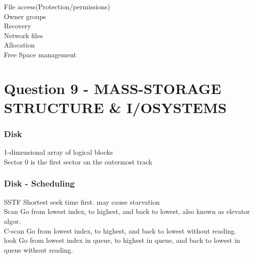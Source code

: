 \documentclass[a4paper,10pt,titlepage]{report}
\begin{document}
\vspace{5mm}
File access(Protection/permissions)\\
\hspace{10mm} Owner groups\\

\vspace{5mm}
Recovery \\


\vspace{5mm}
Network files \\



\vspace{5mm}
Allocation \\


\vspace{5mm}
Free Space management \\

\hspace{10mm}



	




\section{Question 9 - MASS-STORAGE STRUCTURE \& I/OSYSTEMS }


\subsubsection{Disk}
1-dimensional array of logical blocks\\

Sector 0 is the first sector on the outermost track \\

\subsubsection{Disk - Scheduling}
SSTF
Shortest seek time first.
may cause starvation\\

Scan
Go from lowest index, to highest, and back to lowest, also known as elevator algor.\\



C-scan
Go from lowest index, to highest, and back to lowest without reading.\\



look
Go from lowest index in queue, to highest in queue, and back to lowest in queue without reading.\\
\end{document}
